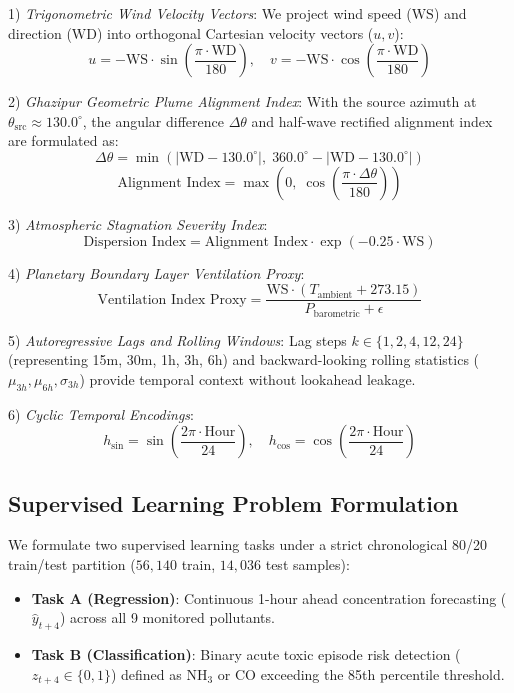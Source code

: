\documentclass[conference]{IEEEtran}
\begin{document}
1) \textit{Trigonometric Wind Velocity Vectors}: We project wind speed ($\text{WS}$) and direction ($\text{WD}$) into orthogonal Cartesian velocity vectors ($u, v$):
\begin{equation}
u = -\text{WS} \cdot \sin\left(\frac{\pi \cdot \text{WD}}{180}\right), \quad v = -\text{WS} \cdot \cos\left(\frac{\pi \cdot \text{WD}}{180}\right)
\end{equation}

2) \textit{Ghazipur Geometric Plume Alignment Index}: With the source azimuth at $\theta_{\text{src}} \approx 130.0^\circ$, the angular difference $\Delta\theta$ and half-wave rectified alignment index are formulated as:
\begin{equation}
\Delta\theta = \min\left( |\text{WD} - 130.0^\circ|,\; 360.0^\circ - |\text{WD} - 130.0^\circ| \right)
\end{equation}
\begin{equation}
\text{Alignment Index} = \max\left( 0,\; \cos\left(\frac{\pi \cdot \Delta\theta}{180}\right) \right)
\end{equation}

3) \textit{Atmospheric Stagnation Severity Index}:
\begin{equation}
\text{Dispersion Index} = \text{Alignment Index} \cdot \exp\left( -0.25 \cdot \text{WS} \right)
\end{equation}

4) \textit{Planetary Boundary Layer Ventilation Proxy}:
\begin{equation}
\text{Ventilation Index Proxy} = \frac{\text{WS} \cdot (T_{\text{ambient}} + 273.15)}{P_{\text{barometric}} + \epsilon}
\end{equation}

5) \textit{Autoregressive Lags and Rolling Windows}: Lag steps $k \in \{1, 2, 4, 12, 24\}$ (representing 15m, 30m, 1h, 3h, 6h) and backward-looking rolling statistics ($\mu_{3h}, \mu_{6h}, \sigma_{3h}$) provide temporal context without lookahead leakage.

6) \textit{Cyclic Temporal Encodings}:
\begin{equation}
h_{\sin} = \sin\left(\frac{2\pi \cdot \text{Hour}}{24}\right), \quad h_{\cos} = \cos\left(\frac{2\pi \cdot \text{Hour}}{24}\right)
\end{equation}

\subsection{Supervised Learning Problem Formulation}
We formulate two supervised learning tasks under a strict chronological 80/20 train/test partition ($56,140$ train, $14,036$ test samples):
\begin{itemize}
    \item \textbf{Task A (Regression)}: Continuous 1-hour ahead concentration forecasting ($\hat{y}_{t+4}$) across all 9 monitored pollutants.
    \item \textbf{Task B (Classification)}: Binary acute toxic episode risk detection ($z_{t+4} \in \{0, 1\}$) defined as $\text{NH}_3$ or $\text{CO}$ exceeding the 85th percentile threshold.
\end{itemize}
\end{document}
